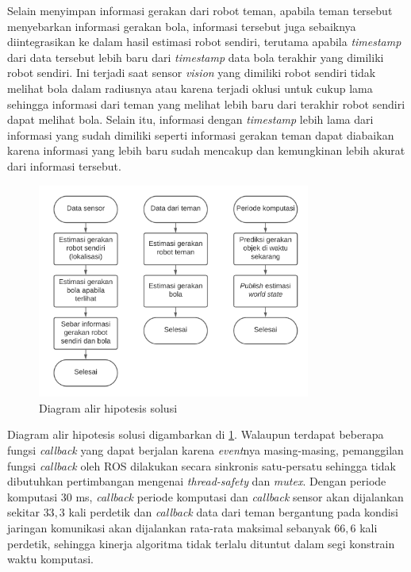 Selain menyimpan informasi gerakan dari robot teman, apabila teman tersebut menyebarkan informasi gerakan bola, informasi tersebut juga sebaiknya diintegrasikan ke dalam hasil estimasi robot sendiri, terutama apabila \textit{timestamp} dari data tersebut lebih baru dari \textit{timestamp} data bola terakhir yang dimiliki robot sendiri. Ini terjadi saat sensor \textit{vision} yang dimiliki robot sendiri tidak melihat bola dalam radiusnya atau karena terjadi oklusi untuk cukup lama sehingga informasi dari teman yang melihat lebih baru dari terakhir robot sendiri dapat melihat bola. Selain itu, informasi dengan \textit{timestamp} lebih lama dari informasi yang sudah dimiliki seperti informasi gerakan teman dapat diabaikan karena informasi yang lebih baru sudah mencakup dan kemungkinan lebih akurat dari informasi tersebut.

\begin{figure}[h]
    \centering
    \medskip
    \includegraphics[width=0.8\textwidth]{resources/solution-flowchart.png}
    \caption{Diagram alir hipotesis solusi}
    \label{fig:solution-flowchart}
    \bigskip
\end{figure}

Diagram alir hipotesis solusi digambarkan di \ref{fig:solution-flowchart}. Walaupun terdapat beberapa fungsi \textit{callback} yang dapat berjalan karena \textit{event}nya masing-masing, pemanggilan fungsi \textit{callback} oleh ROS dilakukan secara sinkronis satu-persatu sehingga tidak dibutuhkan pertimbangan mengenai \textit{thread-safety} dan \textit{mutex}. Dengan periode komputasi $30$ ms, \textit{callback} periode komputasi dan \textit{callback} sensor akan dijalankan sekitar $33,3$ kali perdetik dan \textit{callback} data dari teman bergantung pada kondisi jaringan komunikasi akan dijalankan rata-rata maksimal sebanyak $66,6$ kali perdetik, sehingga kinerja algoritma tidak terlalu dituntut dalam segi konstrain waktu komputasi.

